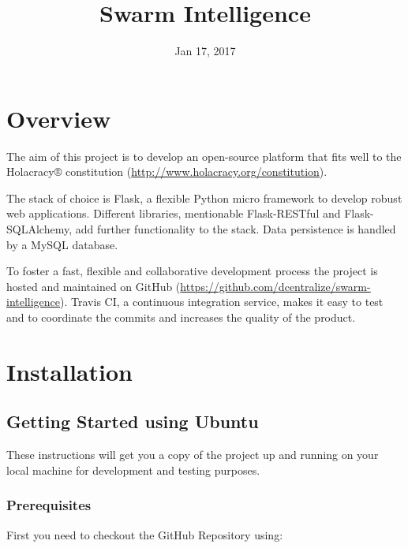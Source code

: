 \documentclass[letterpaper,10pt,english]{sphinxmanual}
\title{Swarm Intelligence}
\date{Jan 17, 2017}
\author{}
\begin{document}
\maketitle
\sphinxtableofcontents
{}\label{\detokenize{index::doc}}



\chapter{Overview}
\label{\detokenize{overview:overview}}\label{\detokenize{overview::doc}}\label{\detokenize{overview:swarm-intelligence-platform}}
The aim of this project is to develop an open-source platform that fits well to the Holacracy® constitution (\url{http://www.holacracy.org/constitution}).

The stack of choice is Flask, a flexible Python micro framework to develop robust web applications.  Different libraries, mentionable Flask-RESTful and Flask-SQLAlchemy, add further functionality to the stack. Data persistence is handled by a MySQL database.

To foster a fast, flexible and collaborative development process the project is hosted and maintained on GitHub (\url{https://github.com/dcentralize/swarm-intelligence}). Travis CI, a continuous integration service, makes it easy to test and to coordinate the commits and increases the quality of the product.


\chapter{Installation}
\label{\detokenize{installation::doc}}\label{\detokenize{installation:installation}}

\section{Getting Started using Ubuntu}
\label{\detokenize{installation:getting-started-using-ubuntu}}
These instructions will get you a copy of the project up and running on your local machine for development and testing purposes.


\subsection{Prerequisites}
\label{\detokenize{installation:prerequisites}}
First you need to checkout the GitHub Repository using:

\begin{sphinxVerbatim}[commandchars=\\\{\}]
  
\end{sphinxVerbatim}
\end{document}
